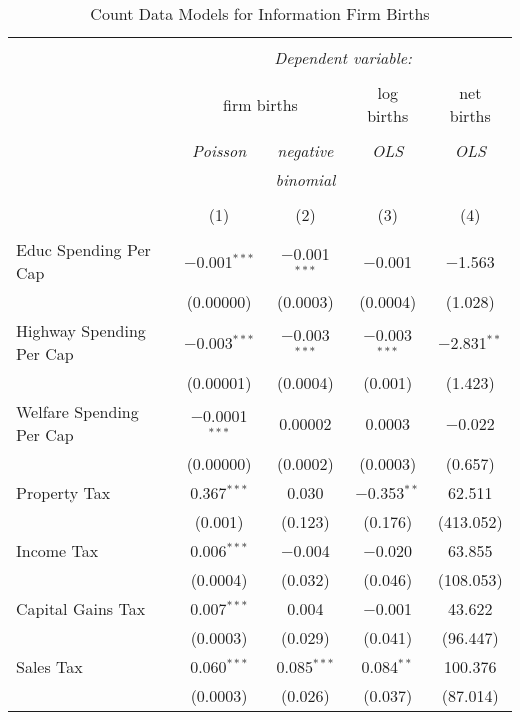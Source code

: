 
\begin{table}[!htbp] \centering 
  \caption{Count Data Models for Information Firm Births} 
  \label{} 
\begin{tabular}{@{\extracolsep{5pt}}lcccc} 
\\[-1.8ex]\hline 
\hline \\[-1.8ex] 
 & \multicolumn{4}{c}{\textit{Dependent variable:}} \\ 
\cline{2-5} 
\\[-1.8ex] & \multicolumn{2}{c}{firm births} & log births & net births \\ 
\\[-1.8ex] & \textit{Poisson} & \textit{negative} & \textit{OLS} & \textit{OLS} \\ 
 & \textit{} & \textit{binomial} & \textit{} & \textit{} \\ 
\\[-1.8ex] & (1) & (2) & (3) & (4)\\ 
\hline \\[-1.8ex] 
 Educ Spending Per Cap & $-$0.001$^{***}$ & $-$0.001$^{***}$ & $-$0.001 & $-$1.563 \\ 
  & (0.00000) & (0.0003) & (0.0004) & (1.028) \\ 
  Highway Spending Per Cap  & $-$0.003$^{***}$ & $-$0.003$^{***}$ & $-$0.003$^{***}$ & $-$2.831$^{**}$ \\ 
  & (0.00001) & (0.0004) & (0.001) & (1.423) \\ 
  Welfare Spending Per Cap  & $-$0.0001$^{***}$ & 0.00002 & 0.0003 & $-$0.022 \\ 
  & (0.00000) & (0.0002) & (0.0003) & (0.657) \\ 
  Property Tax & 0.367$^{***}$ & 0.030 & $-$0.353$^{**}$ & 62.511 \\ 
  & (0.001) & (0.123) & (0.176) & (413.052) \\ 
  Income Tax & 0.006$^{***}$ & $-$0.004 & $-$0.020 & 63.855 \\ 
  & (0.0004) & (0.032) & (0.046) & (108.053) \\ 
  Capital Gains Tax & 0.007$^{***}$ & 0.004 & $-$0.001 & 43.622 \\ 
  & (0.0003) & (0.029) & (0.041) & (96.447) \\ 
  Sales Tax & 0.060$^{***}$ & 0.085$^{***}$ & 0.084$^{**}$ & 100.376 \\ 
  & (0.0003) & (0.026) & (0.037) & (87.014) \\ 

\end{tabular}
\end{table}
